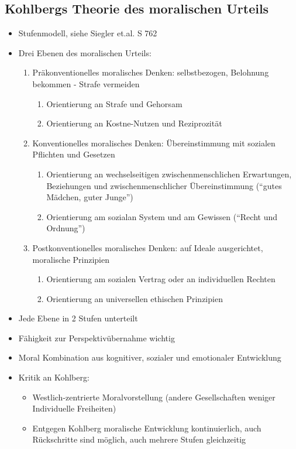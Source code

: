 \subsection{Kohlbergs Theorie des moralischen Urteils}
\begin{itemize}
	\item
		Stufenmodell, siehe Siegler et.al. S 762
	\item
		Drei Ebenen des moralischen Urteils:
		\begin{enumerate}
			\item
				Präkonventionelles moralisches Denken: selbstbezogen, Belohnung bekommen - Strafe vermeiden
				\begin{enumerate}
					\item
						Orientierung an Strafe und Gehorsam
					\item
						Orientierung an Kostne-Nutzen und Reziprozität
				\end{enumerate}
			\item
				Konventionelles moralisches Denken: Übereinstimmung mit sozialen Pflichten und Gesetzen
				\begin{enumerate}
					\item
						Orientierung an wechselseitigen zwischenmenschlichen Erwartungen, Beziehungen und zwischenmenschlicher Übereinstimmung (\enquote{gutes Mädchen, guter Junge})
					\item
						Orientierung am sozialan System und am Gewissen (\enquote{Recht und Ordnung})
			\end{enumerate}
			\item
				Postkonventionelles moralisches Denken: auf Ideale ausgerichtet, moralische Prinzipien
				\begin{enumerate}
					\item
						Orientierung am sozialen Vertrag oder an individuellen Rechten
					\item
						Orientierung an universellen ethischen Prinzipien
			\end{enumerate}
		\end{enumerate}
	\item
		Jede Ebene in 2 Stufen unterteilt
	\item
		Fähigkeit zur Perspektivübernahme wichtig
	\item
		Moral Kombination aus kognitiver, sozialer und emotionaler Entwicklung
	\item
		Kritik an Kohlberg:
		\begin{itemize}
			\item
				Westlich-zentrierte Moralvorstellung (andere Gesellschaften weniger Individuelle Freiheiten)
			\item
				Entgegen Kohlberg moralische Entwicklung kontinuierlich, auch Rückschritte sind möglich, auch mehrere Stufen gleichzeitig
		\end{itemize}
\end{itemize}



